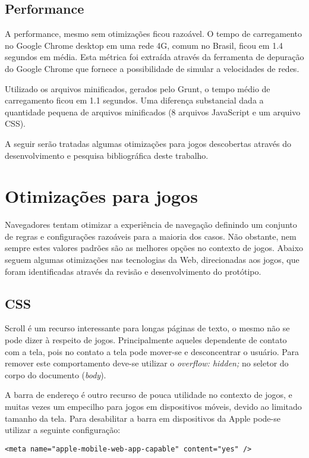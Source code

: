 \subsection{Performance}

A performance, mesmo sem otimizações ficou razoável. O tempo de
carregamento no Google Chrome desktop em uma rede 4G, comum no Brasil,
ficou em 1.4 segundos em média. Esta métrica foi extraída através da
ferramenta de depuração do Google Chrome que fornece a possibilidade
de simular a velocidades de redes.

Utilizado os arquivos minificados, gerados pelo Grunt, o tempo médio
de carregamento ficou em 1.1 segundos. Uma diferença substancial dada a
quantidade pequena de arquivos minificados (8 arquivos JavaScript e um
arquivo CSS).

A seguir serão tratadas algumas otimizações para jogos descobertas
através do desenvolvimento e pesquisa bibliográfica deste trabalho.

\section{Otimizações para jogos} \label{optimizations}
Navegadores tentam otimizar a experiência de navegação definindo
um conjunto de regras e configurações razoáveis para a maioria dos
casos. Não obstante, nem sempre estes valores padrões são as melhores
opções no contexto de jogos. Abaixo seguem algumas otimizações
nas tecnologias da Web, direcionadas aos jogos, que foram identificadas
através da revisão e desenvolvimento do protótipo.

\subsection{CSS}

Scroll é um recurso interessante para longas páginas de texto,
o mesmo não se pode dizer à respeito de jogos.
Principalmente aqueles dependente de contato com a tela, pois
no contato a tela pode mover-se e desconcentrar o usuário. Para
remover este comportamento deve-se utilizar o \textit{overflow:
hidden;} no seletor do corpo do documento (\textit{body}).

A barra de endereço é outro recurso de pouca utilidade no contexto
de jogos, e muitas vezes um empecilho para jogos em dispositivos
móveis, devido ao limitado tamanho da tela. Para desabilitar a barra em
dispositivos da Apple pode-se utilizar a seguinte configuração:

\begin{verbatim}
<meta name="apple-mobile-web-app-capable" content="yes" />
\end{verbatim}

